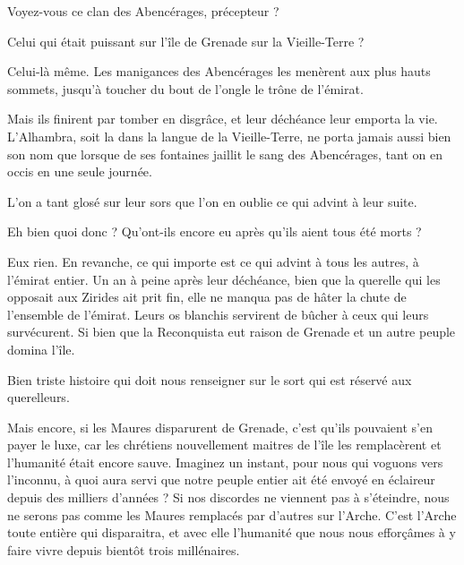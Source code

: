 \begin{drama}

  \elenaspeaks Voyez-vous ce clan des Abencérages, précepteur ?

  \alexasspeaks Celui qui était puissant sur l’île de Grenade sur la Vieille-Terre ?

  \elenaspeaks Celui-là même. Les manigances des Abencérages les menèrent aux plus hauts sommets, jusqu’à toucher du bout de l’ongle le trône de l’émirat.

  \alexasspeaks Mais ils finirent par tomber en disgrâce, et leur déchéance leur emporta la vie. L’Alhambra, soit la  dans la langue de la Vieille-Terre, ne porta jamais aussi bien son nom que lorsque de ses fontaines jaillit le sang des Abencérages, tant on en occis en une seule journée.

  \elenaspeaks L’on a tant glosé sur leur sors que l’on en oublie ce qui advint à leur suite.

  \alexasspeaks Eh bien quoi donc ? Qu’ont-ils encore eu après qu’ils aient tous été morts ?

  \elenaspeaks Eux rien. En revanche, ce qui importe est ce qui advint à tous les autres, à l’émirat entier. Un an à peine après leur déchéance, bien que la querelle qui les opposait aux Zirides ait prit fin, elle ne manqua pas de hâter la chute de l’ensemble de l’émirat. Leurs os blanchis servirent de bûcher à ceux qui leurs survécurent. Si bien que la Reconquista eut raison de Grenade et un autre peuple domina l’île.

  \alexasspeaks Bien triste histoire qui doit nous renseigner sur le sort qui est réservé aux querelleurs.

  \elenaspeaks Mais encore, si les Maures disparurent de Grenade, c’est qu’ils pouvaient s’en payer le luxe, car les chrétiens nouvellement maitres de l’île les remplacèrent et l’humanité était encore sauve. Imaginez un instant, pour nous qui voguons vers l’inconnu, à quoi aura servi que notre peuple entier ait été envoyé en éclaireur depuis des milliers d’années ? Si nos discordes ne viennent pas à s’éteindre, nous ne serons pas comme les Maures remplacés par d’autres sur l’Arche. C’est l’Arche toute entière qui disparaitra, et avec elle l’humanité que nous nous efforçâmes à y faire vivre depuis bientôt trois millénaires.



\end{drama}
